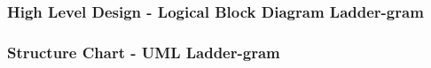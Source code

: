 \documentclass[12pt, a4]{report}
\begin{document}
	\subsubsection{High Level Design - Logical Block Diagram \textbar{} Ladder-gram}

	\pagebreak

	\subsubsection{Structure Chart - UML \textbar{} Ladder-gram}
	\paragraph{}

\end{document}

